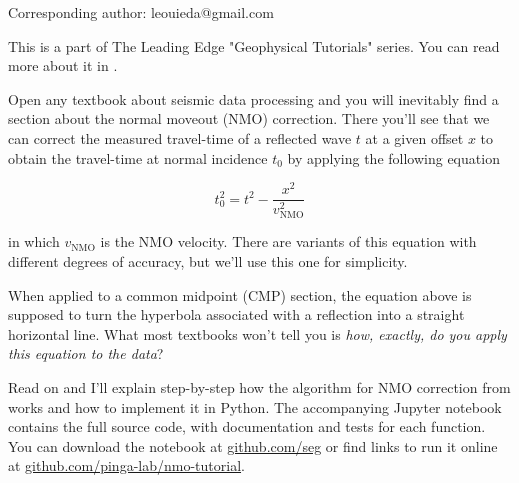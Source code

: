 Corresponding author: leouieda@gmail.com

This is a part of The Leading Edge "Geophysical Tutorials" series.
You can read more about it in \citet{Hall_2016a}.

Open any textbook about seismic data processing and you will inevitably find a
section about the normal moveout (NMO) correction.
There you'll see that we can correct the measured travel-time of a reflected
wave $t$ at a given offset $x$ to obtain the travel-time at normal
incidence $t_0$ by applying the following equation 

\begin{equation}
t_0^2=t^2-\dfrac{x^2}{v_\mathrm{NMO}^2}
\label{eq:traveltime}
\end{equation}

in which $v_\mathrm{NMO}$ is the NMO velocity.
There are variants of this equation with different degrees of accuracy, 
but we'll use this one for simplicity.

When applied to a common midpoint (CMP) section, the equation above is
supposed to turn the hyperbola associated with a reflection into a straight
horizontal line.
What most textbooks won't tell you is \textit{how, exactly, do you apply this
equation to the data}?

Read on and I'll explain step-by-step how the algorithm for NMO correction from
\citet{Yilmaz_2001} works and how to implement it in Python.
The accompanying Jupyter notebook \citep{Perez_2007} contains the full source
code, with documentation and tests for each function.
You can download the notebook at
\href{https://github.com/seg}{github.com/seg} or
find links to run it online at
\href{https://github.com/pinga-lab/nmo-tutorial}{github.com/pinga-lab/nmo-tutorial}.
